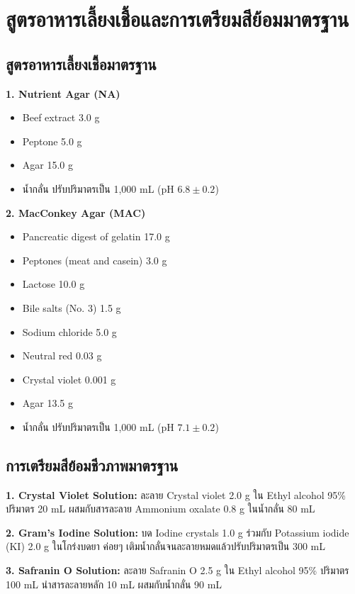 \chapter{สูตรอาหารเลี้ยงเชื้อและการเตรียมสีย้อมมาตรฐาน}
\label{app:appendixA}

\section{สูตรอาหารเลี้ยงเชื้อมาตรฐาน}
\noindent\textbf{1. Nutrient Agar (NA)}
\begin{itemize}
    \item Beef extract 3.0 g
    \item Peptone 5.0 g
    \item Agar 15.0 g
    \item น้ำกลั่น ปรับปริมาตรเป็น 1,000 mL (pH $6.8 \pm 0.2$)
\end{itemize}

\noindent\textbf{2. MacConkey Agar (MAC)}
\begin{itemize}
    \item Pancreatic digest of gelatin 17.0 g
    \item Peptones (meat and casein) 3.0 g
    \item Lactose 10.0 g
    \item Bile salts (No. 3) 1.5 g
    \item Sodium chloride 5.0 g
    \item Neutral red 0.03 g
    \item Crystal violet 0.001 g
    \item Agar 13.5 g
    \item น้ำกลั่น ปรับปริมาตรเป็น 1,000 mL (pH $7.1 \pm 0.2$)
\end{itemize}

\section{การเตรียมสีย้อมชีวภาพมาตรฐาน}
\noindent\textbf{1. Crystal Violet Solution:} ละลาย Crystal violet 2.0 g ใน Ethyl alcohol 95\% ปริมาตร 20 mL ผสมกับสารละลาย Ammonium oxalate 0.8 g ในน้ำกลั่น 80 mL

\noindent\textbf{2. Gram's Iodine Solution:} บด Iodine crystals 1.0 g ร่วมกับ Potassium iodide (KI) 2.0 g ในโกร่งบดยา ค่อยๆ เติมน้ำกลั่นจนละลายหมดแล้วปรับปริมาตรเป็น 300 mL

\noindent\textbf{3. Safranin O Solution:} ละลาย Safranin O 2.5 g ใน Ethyl alcohol 95\% ปริมาตร 100 mL นำสารละลายหลัก 10 mL ผสมกับน้ำกลั่น 90 mL
